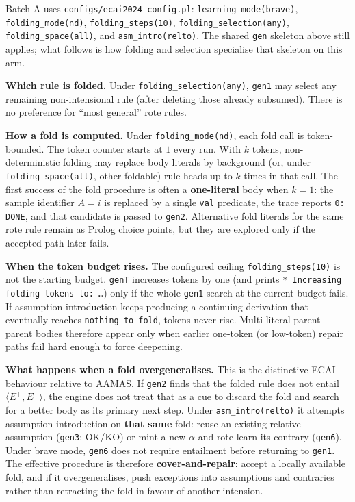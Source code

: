 \documentclass[11pt]{article}
\begin{document}
Batch A uses \texttt{configs/ecai2024\_config.pl}: \texttt{learning\_mode(brave)}, \texttt{folding\_mode(nd)}, \texttt{folding\_steps(10)}, \texttt{folding\_selection(any)}, \texttt{folding\_space(all)}, and \texttt{asm\_intro(relto)}. The shared \texttt{gen} skeleton above still applies; what follows is how folding and selection specialise that skeleton on this arm.

\textbf{Which rule is folded.} Under \texttt{folding\_selection(any)}, \texttt{gen1} may select any remaining non-intensional rule (after deleting those already subsumed). There is no preference for ``most general'' rote rules.

\textbf{How a fold is computed.} Under \texttt{folding\_mode(nd)}, each fold call is token-bounded. The token counter starts at \(1\) every run. With \(k\) tokens, non-deterministic folding may replace body literals by background (or, under \texttt{folding\_space(all)}, other foldable) rule heads up to \(k\) times in that call. The first success of the fold procedure is often a \textbf{one-literal} body when \(k=1\): the sample identifier \(A=i\) is replaced by a single \texttt{val} predicate, the trace reports \texttt{0: DONE}, and that candidate is passed to \texttt{gen2}. Alternative fold literals for the same rote rule remain as Prolog choice points, but they are explored only if the accepted path later fails.

\textbf{When the token budget rises.} The configured ceiling \texttt{folding\_steps(10)} is not the starting budget. \texttt{genT} increases tokens by one (and prints \texttt{* Increasing folding tokens to: \ldots{}}) only if the whole \texttt{gen1} search at the current budget fails. If assumption introduction keeps producing a continuing derivation that eventually reaches \texttt{nothing to fold}, tokens never rise. Multi-literal parent--parent bodies therefore appear only when earlier one-token (or low-token) repair paths fail hard enough to force deepening.

\textbf{What happens when a fold overgeneralises.} This is the distinctive ECAI behaviour relative to AAMAS. If \texttt{gen2} finds that the folded rule does not entail \(\langle E^+,E^-\rangle\), the engine does not treat that as a cue to discard the fold and search for a better body as its primary next step. Under \texttt{asm\_intro(relto)} it attempts assumption introduction on \textbf{that same} fold: reuse an existing relative assumption (\texttt{gen3}: OK/KO) or mint a new \(\alpha\) and rote-learn its contrary (\texttt{gen6}). Under brave mode, \texttt{gen6} does not require entailment before returning to \texttt{gen1}. The effective procedure is therefore \textbf{cover-and-repair}: accept a locally available fold, and if it overgeneralises, push exceptions into assumptions and contraries rather than retracting the fold in favour of another intension.
\end{document}
